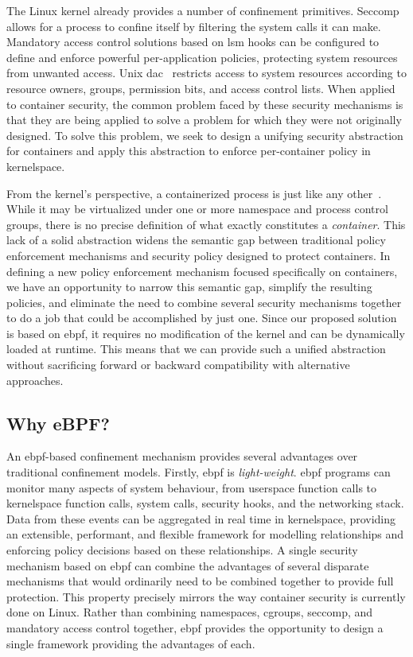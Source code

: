 The Linux kernel already provides a number of confinement primitives. Seccomp allows for
a process to confine itself by filtering the system calls it can make. Mandatory access
control solutions based on \gls{lsm} hooks can be configured to define and enforce
powerful per-application policies, protecting system resources from unwanted access. Unix
\gls{dac}~\cite{ritchie1974_unix, van_oorschot2020_tools_jewels, jaeger2008_os_security,
shu2016_security_isolation_study} restricts access to system resources according to
resource owners, groups, permission bits, and access control lists. When applied to
container security, the common problem faced by these security mechanisms is that they are
being applied to solve a problem for which they were not originally designed. To solve
this problem, we seek to design a unifying security abstraction for containers and apply
this abstraction to enforce per-container policy in kernelspace.

From the kernel's perspective, a containerized process is just like any
other~\cite{sultan2019_container_security}. While it may be virtualized under one or more
namespace and process control groups, there is no precise definition of what exactly
constitutes a \textit{container}. This lack of a solid abstraction widens the semantic gap
between traditional policy enforcement mechanisms and security policy designed to protect
containers. In defining a new policy enforcement mechanism focused specifically on
containers, we have an opportunity to narrow this semantic gap, simplify the resulting
policies, and eliminate the need to combine several security mechanisms together to do
a job that could be accomplished by just one. Since our proposed solution is based on
\gls{ebpf}, it requires no modification of the kernel and can be dynamically loaded at
runtime.  This means that we can provide such a unified abstraction without sacrificing
forward or backward compatibility with alternative approaches.

\subsection{Why eBPF?}%
\label{ss:why-ebpf}

An \gls{ebpf}-based confinement mechanism provides several advantages over traditional
confinement models.  Firstly, \gls{ebpf} is \textit{light-weight}. \gls{ebpf} programs can monitor
many aspects of system behaviour, from userspace function calls to kernelspace function
calls, system calls, security hooks, and the networking stack. Data from these events can
be aggregated in real time in kernelspace, providing an extensible, performant, and
flexible framework for modelling relationships and enforcing policy decisions based on
these relationships.  A single security mechanism based on \gls{ebpf} can combine the advantages
of several disparate mechanisms that would ordinarily need to be combined together to
provide full protection. This property precisely mirrors the way container security is
currently done on Linux. Rather than combining namespaces, cgroups, seccomp, and mandatory
access control together, \gls{ebpf} provides the opportunity to design a single framework
providing the advantages of each.

